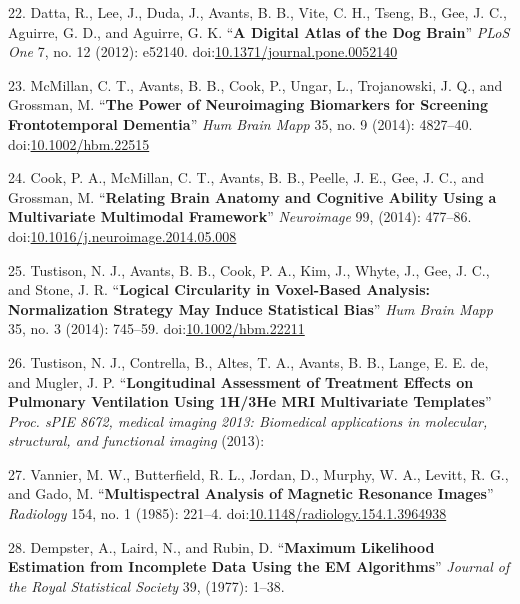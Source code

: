 \documentclass[11pt,]{article}
\begin{document}
\hypertarget{ref-Datta:2012aa}{}
22. Datta, R., Lee, J., Duda, J., Avants, B. B., Vite, C. H., Tseng, B.,
Gee, J. C., Aguirre, G. D., and Aguirre, G. K. ``\textbf{A Digital Atlas
of the Dog Brain}'' \emph{PLoS One} 7, no. 12 (2012): e52140.
doi:\href{https://doi.org/10.1371/journal.pone.0052140}{10.1371/journal.pone.0052140}

\hypertarget{ref-McMillan:2014aa}{}
23. McMillan, C. T., Avants, B. B., Cook, P., Ungar, L., Trojanowski, J.
Q., and Grossman, M. ``\textbf{The Power of Neuroimaging Biomarkers for
Screening Frontotemporal Dementia}'' \emph{Hum Brain Mapp} 35, no. 9
(2014): 4827--40.
doi:\href{https://doi.org/10.1002/hbm.22515}{10.1002/hbm.22515}

\hypertarget{ref-Cook:2014aa}{}
24. Cook, P. A., McMillan, C. T., Avants, B. B., Peelle, J. E., Gee, J.
C., and Grossman, M. ``\textbf{Relating Brain Anatomy and Cognitive
Ability Using a Multivariate Multimodal Framework}'' \emph{Neuroimage}
99, (2014): 477--86.
doi:\href{https://doi.org/10.1016/j.neuroimage.2014.05.008}{10.1016/j.neuroimage.2014.05.008}

\hypertarget{ref-Tustison:2014ad}{}
25. Tustison, N. J., Avants, B. B., Cook, P. A., Kim, J., Whyte, J.,
Gee, J. C., and Stone, J. R. ``\textbf{Logical Circularity in
Voxel-Based Analysis: Normalization Strategy May Induce Statistical
Bias}'' \emph{Hum Brain Mapp} 35, no. 3 (2014): 745--59.
doi:\href{https://doi.org/10.1002/hbm.22211}{10.1002/hbm.22211}

\hypertarget{ref-Tustison:2013ad}{}
26. Tustison, N. J., Contrella, B., Altes, T. A., Avants, B. B., Lange,
E. E. de, and Mugler, J. P. ``\textbf{Longitudinal Assessment of
Treatment Effects on Pulmonary Ventilation Using 1H/3He MRI Multivariate
Templates}'' \emph{Proc. sPIE 8672, medical imaging 2013: Biomedical
applications in molecular, structural, and functional imaging} (2013):

\hypertarget{ref-Vannier:1985aa}{}
27. Vannier, M. W., Butterfield, R. L., Jordan, D., Murphy, W. A.,
Levitt, R. G., and Gado, M. ``\textbf{Multispectral Analysis of Magnetic
Resonance Images}'' \emph{Radiology} 154, no. 1 (1985): 221--4.
doi:\href{https://doi.org/10.1148/radiology.154.1.3964938}{10.1148/radiology.154.1.3964938}

\hypertarget{ref-Dempster:1977aa}{}
28. Dempster, A., Laird, N., and Rubin, D. ``\textbf{Maximum Likelihood
Estimation from Incomplete Data Using the EM Algorithms}'' \emph{Journal
of the Royal Statistical Society} 39, (1977): 1--38.
\end{document}
